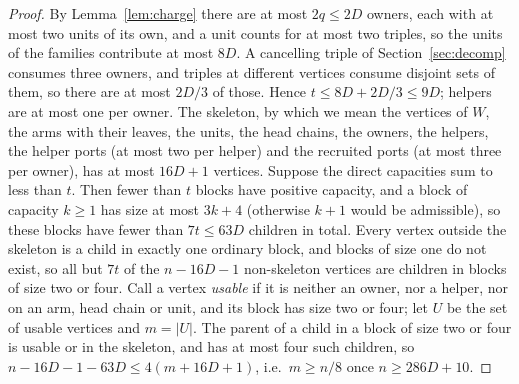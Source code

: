 \documentclass[11pt,a4paper]{article}
\theoremstyle{plain}
\theoremstyle{definition}
\theoremstyle{remark}
\begin{document}
\begin{proof}
By Lemma~\ref{lem:charge} there are at most $2q\le 2D$ owners, each with at
most two units of its own, and a unit counts for at most two triples, so the
units of the families contribute at most $8D$.  A cancelling triple of
Section~\ref{sec:decomp} consumes three owners, and triples at different
vertices consume disjoint sets of them, so there are at most $2D/3$ of those.
Hence $t\le 8D+2D/3\le 9D$; helpers are at most one per owner.  The skeleton, by which we
mean the vertices of $W$, the arms with their leaves, the units, the head
chains, the owners, the helpers, the helper ports (at most two per helper)
and the recruited ports (at most three per owner), has at most $16D+1$
vertices.  Suppose the direct capacities sum to less than
$t$.  Then fewer than $t$ blocks have positive capacity, and a block of
capacity $k\ge 1$ has size at most $3k+4$ (otherwise $k+1$ would be
admissible), so these blocks have fewer than $7t\le 63D$ children in total.
Every vertex outside the skeleton is a child in exactly one ordinary block,
and blocks of size one do not exist, so all but $7t$ of the $n-16D-1$
non-skeleton vertices are children in blocks of size two or four.  Call a
vertex \emph{usable} if it is neither an owner, nor a helper, nor on an arm,
head chain or unit, and its block has size two or four; let $U$ be the set of
usable vertices and $m=|U|$.  The parent of a child in a block of size two or
four is usable or in the skeleton, and has at most four such children, so
$n-16D-1-63D\le 4(m+16D+1)$, i.e.\ $m\ge n/8$ once $n\ge 286D+10$.


\end{proof}
\end{document}
